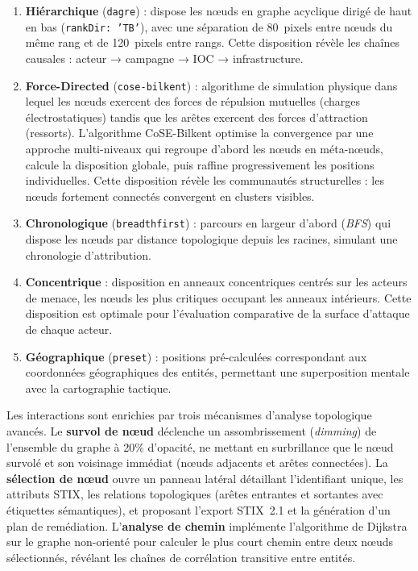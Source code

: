 \begin{enumerate}
    \item \textbf{Hiérarchique} (\texttt{dagre}) : dispose les nœuds en graphe acyclique dirigé de haut en bas (\texttt{rankDir: 'TB'}), avec une séparation de 80~pixels entre nœuds du même rang et de 120~pixels entre rangs. Cette disposition révèle les chaînes causales : acteur → campagne → IOC → infrastructure.
    \item \textbf{Force-Directed} (\texttt{cose-bilkent}) : algorithme de simulation physique dans lequel les nœuds exercent des forces de répulsion mutuelles (charges électrostatiques) tandis que les arêtes exercent des forces d'attraction (ressorts). L'algorithme CoSE-Bilkent optimise la convergence par une approche multi-niveaux qui regroupe d'abord les nœuds en méta-nœuds, calcule la disposition globale, puis raffine progressivement les positions individuelles. Cette disposition révèle les communautés structurelles : les nœuds fortement connectés convergent en clusters visibles.
    \item \textbf{Chronologique} (\texttt{breadthfirst}) : parcours en largeur d'abord (\textit{BFS}) qui dispose les nœuds par distance topologique depuis les racines, simulant une chronologie d'attribution.
    \item \textbf{Concentrique} : disposition en anneaux concentriques centrés sur les acteurs de menace, les nœuds les plus critiques occupant les anneaux intérieurs. Cette disposition est optimale pour l'évaluation comparative de la surface d'attaque de chaque acteur.
    \item \textbf{Géographique} (\texttt{preset}) : positions pré-calculées correspondant aux coordonnées géographiques des entités, permettant une superposition mentale avec la cartographie tactique.
\end{enumerate}

Les interactions sont enrichies par trois mécanismes d'analyse topologique avancés. Le \textbf{survol de nœud} déclenche un assombrissement (\textit{dimming}) de l'ensemble du graphe à 20\% d'opacité, ne mettant en surbrillance que le nœud survolé et son voisinage immédiat (nœuds adjacents et arêtes connectées). La \textbf{sélection de nœud} ouvre un panneau latéral détaillant l'identifiant unique, les attributs STIX, les relations topologiques (arêtes entrantes et sortantes avec étiquettes sémantiques), et proposant l'export STIX~2.1 et la génération d'un plan de remédiation. L'\textbf{analyse de chemin} implémente l'algorithme de Dijkstra sur le graphe non-orienté pour calculer le plus court chemin entre deux nœuds sélectionnés, révélant les chaînes de corrélation transitive entre entités.

